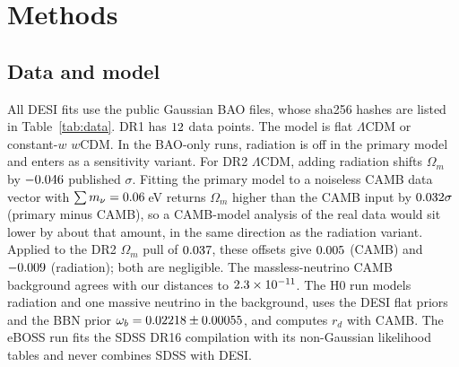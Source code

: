\documentclass[11pt]{article}
\begin{document}
\section{Methods}
\subsection{Data and model}
All DESI fits use the public Gaussian BAO files, whose sha256 hashes are listed in Table~\ref{tab:data}. DR1 has $12$ data points.
The model is flat $\Lambda$CDM or constant-$w$ $w$CDM. In the BAO-only runs, radiation is off in the primary model and enters as a
sensitivity variant. For DR2 $\Lambda$CDM, adding radiation shifts $\Omega_m$ by $-0.046$ published $\sigma$. Fitting the primary model to a
noiseless CAMB data vector with $\sum m_\nu=0.06$\,eV returns $\Omega_m$ higher than the CAMB input by $0.032\sigma$ (primary minus CAMB), so a
CAMB-model analysis of the real data would sit lower by about that amount, in the same direction as the radiation variant. Applied to the DR2
$\Omega_m$ pull of $0.037$, these offsets give $0.005$ (CAMB) and $-0.009$ (radiation); both are negligible. The massless-neutrino CAMB background agrees with our distances to
$2.3\times10^{-11}$. The H0 run models radiation and one massive neutrino in the background, uses the DESI flat priors and the BBN prior
$\omega_b=0.02218\pm0.00055$, and computes $r_d$ with CAMB. The eBOSS run fits the SDSS DR16 compilation with its non-Gaussian
likelihood tables and never combines SDSS with DESI.
\end{document}
